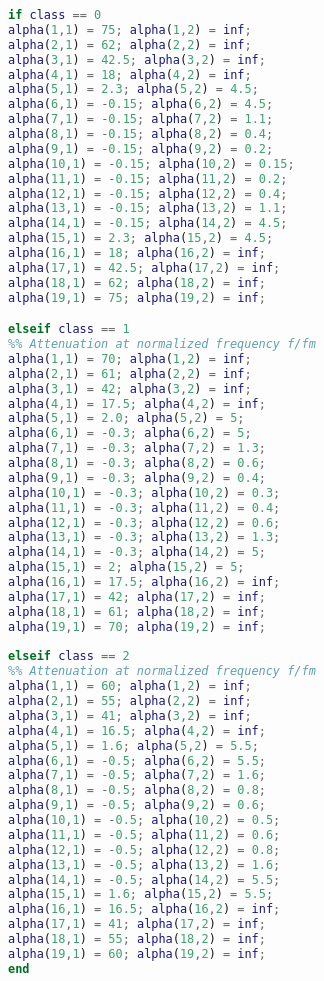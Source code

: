 \begin{lstlisting}[language=Matlab, caption = {Matlab script for standard functions},label={ls:StandardFunctions}]
if class == 0
alpha(1,1) = 75; alpha(1,2) = inf;
alpha(2,1) = 62; alpha(2,2) = inf;
alpha(3,1) = 42.5; alpha(3,2) = inf;
alpha(4,1) = 18; alpha(4,2) = inf;
alpha(5,1) = 2.3; alpha(5,2) = 4.5;
alpha(6,1) = -0.15; alpha(6,2) = 4.5;
alpha(7,1) = -0.15; alpha(7,2) = 1.1;
alpha(8,1) = -0.15; alpha(8,2) = 0.4;
alpha(9,1) = -0.15; alpha(9,2) = 0.2;
alpha(10,1) = -0.15; alpha(10,2) = 0.15;
alpha(11,1) = -0.15; alpha(11,2) = 0.2;
alpha(12,1) = -0.15; alpha(12,2) = 0.4;
alpha(13,1) = -0.15; alpha(13,2) = 1.1;
alpha(14,1) = -0.15; alpha(14,2) = 4.5;
alpha(15,1) = 2.3; alpha(15,2) = 4.5;
alpha(16,1) = 18; alpha(16,2) = inf;
alpha(17,1) = 42.5; alpha(17,2) = inf;
alpha(18,1) = 62; alpha(18,2) = inf;
alpha(19,1) = 75; alpha(19,2) = inf;

elseif class == 1
%% Attenuation at normalized frequency f/fm
alpha(1,1) = 70; alpha(1,2) = inf;
alpha(2,1) = 61; alpha(2,2) = inf;
alpha(3,1) = 42; alpha(3,2) = inf;
alpha(4,1) = 17.5; alpha(4,2) = inf;
alpha(5,1) = 2.0; alpha(5,2) = 5;
alpha(6,1) = -0.3; alpha(6,2) = 5;
alpha(7,1) = -0.3; alpha(7,2) = 1.3;
alpha(8,1) = -0.3; alpha(8,2) = 0.6;
alpha(9,1) = -0.3; alpha(9,2) = 0.4;
alpha(10,1) = -0.3; alpha(10,2) = 0.3;
alpha(11,1) = -0.3; alpha(11,2) = 0.4;
alpha(12,1) = -0.3; alpha(12,2) = 0.6;
alpha(13,1) = -0.3; alpha(13,2) = 1.3;
alpha(14,1) = -0.3; alpha(14,2) = 5;
alpha(15,1) = 2; alpha(15,2) = 5;
alpha(16,1) = 17.5; alpha(16,2) = inf;
alpha(17,1) = 42; alpha(17,2) = inf;
alpha(18,1) = 61; alpha(18,2) = inf;
alpha(19,1) = 70; alpha(19,2) = inf;
    
elseif class == 2
%% Attenuation at normalized frequency f/fm
alpha(1,1) = 60; alpha(1,2) = inf;
alpha(2,1) = 55; alpha(2,2) = inf;
alpha(3,1) = 41; alpha(3,2) = inf;
alpha(4,1) = 16.5; alpha(4,2) = inf;
alpha(5,1) = 1.6; alpha(5,2) = 5.5;
alpha(6,1) = -0.5; alpha(6,2) = 5.5;
alpha(7,1) = -0.5; alpha(7,2) = 1.6;
alpha(8,1) = -0.5; alpha(8,2) = 0.8;
alpha(9,1) = -0.5; alpha(9,2) = 0.6;
alpha(10,1) = -0.5; alpha(10,2) = 0.5;
alpha(11,1) = -0.5; alpha(11,2) = 0.6;
alpha(12,1) = -0.5; alpha(12,2) = 0.8;
alpha(13,1) = -0.5; alpha(13,2) = 1.6;
alpha(14,1) = -0.5; alpha(14,2) = 5.5;
alpha(15,1) = 1.6; alpha(15,2) = 5.5;
alpha(16,1) = 16.5; alpha(16,2) = inf;
alpha(17,1) = 41; alpha(17,2) = inf;
alpha(18,1) = 55; alpha(18,2) = inf;
alpha(19,1) = 60; alpha(19,2) = inf;
end
\end{lstlisting}

